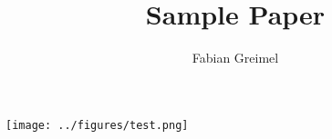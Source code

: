 \documentclass{article}
\title{Sample Paper}
\author{Fabian Greimel}
\begin{document}
\maketitle

\texttt{[image: ../figures/test.png]}
\end{document}
